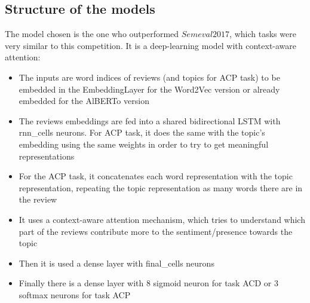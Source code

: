 \documentclass{article}
\begin{document}
        \subsection{Structure of the models}\label{subsec:structure-of-the-models}
        The model chosen is the one who outperformed $Semeval2017$, which tasks were very similar to this competition.
        It is a deep-learning model with context-aware attention:
        \begin{itemize}
            \item The inputs are word indices of reviews (and topics for ACP task) to be embedded in the EmbeddingLayer for the Word2Vec version or already embedded for the AlBERTo version
            \item The reviews embeddings are fed into a shared bidirectional LSTM with rnn\_cells neurons.
                For ACP task, it does the same with the topic's embedding using the same weights in order to try to get meaningful representations
            \item For the ACP task, it concatenates each word representation with the topic representation, repeating the topic representation as many words there are in the review
            \item It uses a context-aware attention mechanism, which tries to understand which part of the reviews contribute more to the sentiment/presence towards the topic
            \item Then it is used a dense layer with final\_cells neurons
            \item Finally there is a dense layer with 8 sigmoid neuron for task ACD or 3 softmax neurons for task ACP
        \end{itemize}
\end{document}
